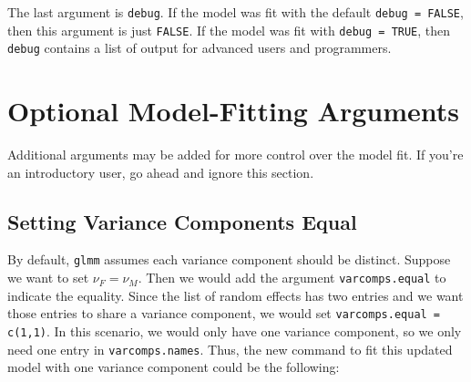 \documentclass[11pt]{article}\usepackage[]{graphicx}\usepackage[]{color}
\begin{document}
The last argument is \texttt{debug}. If the model was fit with the default \texttt{debug = FALSE}, then this argument is just \texttt{FALSE}. If the model was fit with \texttt{debug = TRUE}, then \texttt{debug} contains a list of output for advanced users and programmers.





\section{Optional Model-Fitting Arguments}
Additional arguments may be added for more control over the model fit. If you're an introductory user, go ahead and ignore this section.\\

\subsection{Setting Variance Components Equal}
By default, \texttt{glmm} assumes each variance component should be distinct. Suppose we want to set $\nu_F = \nu_M.$ Then we would add the argument \texttt{varcomps.equal} to indicate the equality. Since the list of random effects has two entries and we want those entries to share a variance component, we would set \texttt{varcomps.equal = c(1,1)}. In this scenario, we would only have one variance component, so we only need one entry in \texttt{varcomps.names}. Thus, the new command to fit this updated model with one variance component could be the following: 
\end{document}
